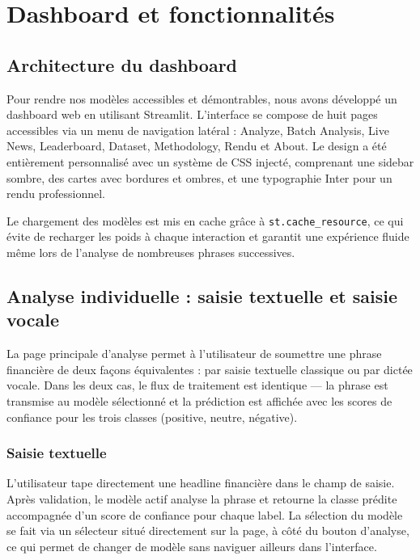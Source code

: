 \documentclass[12pt, a4paper]{article}
\begin{document}
\section{Dashboard et fonctionnalités}

\subsection{Architecture du dashboard}

Pour rendre nos modèles accessibles et démontrables, nous avons développé un
dashboard web en utilisant Streamlit. L'interface se compose de huit pages
accessibles via un menu de navigation latéral : Analyze, Batch Analysis, Live News,
Leaderboard, Dataset, Methodology, Rendu et About. Le design a été entièrement
personnalisé avec un système de CSS injecté, comprenant une sidebar sombre, des
cartes avec bordures et ombres, et une typographie Inter pour un rendu professionnel.

Le chargement des modèles est mis en cache grâce à \texttt{st.cache\_resource},
ce qui évite de recharger les poids à chaque interaction et garantit une expérience
fluide même lors de l'analyse de nombreuses phrases successives.

\subsection{Analyse individuelle : saisie textuelle et saisie vocale}

La page principale d'analyse permet à l'utilisateur de soumettre une phrase
financière de deux façons équivalentes : par saisie textuelle classique ou par
dictée vocale. Dans les deux cas, le flux de traitement est identique --- la phrase
est transmise au modèle sélectionné et la prédiction est affichée avec les scores
de confiance pour les trois classes (positive, neutre, négative).

\subsubsection{Saisie textuelle}

L'utilisateur tape directement une headline financière dans le champ de saisie.
Après validation, le modèle actif analyse la phrase et retourne la classe prédite
accompagnée d'un score de confiance pour chaque label. La sélection du modèle se
fait via un sélecteur situé directement sur la page, à côté du bouton d'analyse,
ce qui permet de changer de modèle sans naviguer ailleurs dans l'interface.
\end{document}
